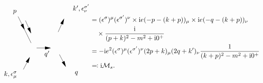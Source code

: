 \begin{equation}
\begin{gathered}
\begin{tikzpicture}[x=0.75pt,y=0.75pt,yscale=-1,xscale=1]
            \draw    (206,140.67) -- (232,193.67) ;
            \draw [shift={(219,167.17)}, rotate = 243.87] [fill={rgb, 255:red, 0; green, 0; blue, 0 }  ][line width=0.08]  [draw opacity=0] (12,-3) -- (0,0) -- (12,3) -- cycle    ;
            \draw    (297.19,146.49) -- (286,171.67) ;
            \draw [shift={(298,144.67)}, rotate = 113.96] [fill={rgb, 255:red, 0; green, 0; blue, 0 }  ][line width=0.08]  [draw opacity=0] (12,-3) -- (0,0) -- (12,3) -- cycle    ;
            \draw    (220.67,148.67) -- (231.2,172.83) ;
            \draw [shift={(232,174.67)}, rotate = 246.45] [fill={rgb, 255:red, 0; green, 0; blue, 0 }  ][line width=0.08]  [draw opacity=0] (12,-3) -- (0,0) -- (12,3) -- cycle    ;
            \draw    (300.58,239.89) -- (288.5,216.67) ;
            \draw [shift={(301.5,241.67)}, rotate = 242.53] [fill={rgb, 255:red, 0; green, 0; blue, 0 }  ][line width=0.08]  [draw opacity=0] (12,-3) -- (0,0) -- (12,3) -- cycle    ;
            \draw    (216.5,246.67) -- (228.58,223.44) ;
            \draw [shift={(229.5,221.67)}, rotate = 117.47] [fill={rgb, 255:red, 0; green, 0; blue, 0 }  ][line width=0.08]  [draw opacity=0] (12,-3) -- (0,0) -- (12,3) -- cycle    ;
            \draw    (269.67,203.67) -- (243,203.67) ;
            \draw [shift={(271.67,203.67)}, rotate = 180] [fill={rgb, 255:red, 0; green, 0; blue, 0 }  ][line width=0.08]  [draw opacity=0] (12,-3) -- (0,0) -- (12,3) -- cycle    ;
            
            \draw (318,249.07) node [anchor=north west][inner sep=0.75pt]    {$q$};
            \draw (204,137.27) node [anchor=south east] [inner sep=0.75pt]    {$p$};
            \draw (257.33,208.07) node [anchor=north west][inner sep=0.75pt]    {$q'$};
            \draw (205,249.07) node [anchor=north east] [inner sep=0.75pt]    {$k,\epsilon _{\mu }^{\sigma }$};
            \draw (314,133.27) node [anchor=south west] [inner sep=0.75pt]    {$k',\epsilon _{\nu }^{\sigma '}$};
            \end{tikzpicture}
    \end{gathered} \begin{aligned}
        &= (\epsilon^\sigma)^\mu (\epsilon^{\sigma'})^\nu \times \ii e (- p - (k+p))_\mu \times \ii e (- q - (k+p))_\nu \\
        &\quad \times \frac{\ii}{(p+k)^2 - m^2 + \ii 0^+}  \\ 
        &= - \ii e^2 (\epsilon^\sigma)^\mu (\epsilon^{\sigma'})^\nu (2p+k)_\mu (2q+k')_\nu \frac{1}{(k+p)^2 - m^2 + \ii 0^+} \\
        &\eqqcolon \ii \mathcal{M}_s.
    \end{aligned}
\end{equation}